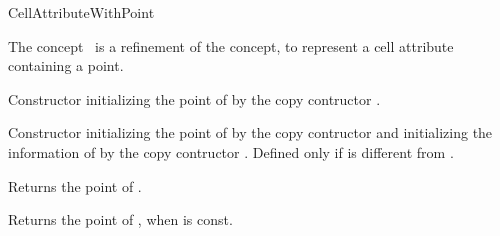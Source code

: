 \ccRefPageBegin
\begin{ccRefConcept}{CellAttributeWithPoint}

\ccDefinition
  
The concept \ccRefName\ is a refinement of the 
concept, to represent a cell attribute containing a point.

\ccRefines
{}

\ccTypes
{} 

\ccCreation
{}


   {Constructor initializing the point of  by the 
    copy contructor .}

   {Constructor initializing the point of  by the 
    copy contructor  and initializing the
    information of  by the 
    copy contructor .
    Defined only if  is different from .}


     {Returns the point of .}

     {Returns the point of , when  is const.}

\ccHasModels
{}

\ccSeeAlso
{}

\end{ccRefConcept}
\ccRefPageEnd
